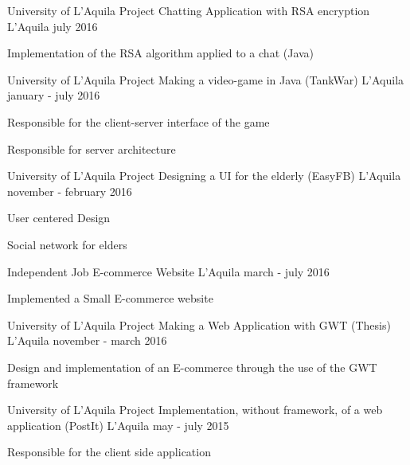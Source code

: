 \begin{cventries}
\cventry
{University of L'Aquila Project} %
{Chatting Application with RSA encryption} %
{L'Aquila} %
{july 2016} %
{ %
	\begin{cvitems}
		\item {Implementation of the RSA algorithm applied to a chat (Java)}
	\end{cvitems}
}

\cventry
{University of L'Aquila Project} %
{Making a video-game in Java (TankWar)} %
{L'Aquila} %
{january - july 2016} %
{ %
	\begin{cvitems}
		\item {Responsible for the client-server interface of the game}
		\item {Responsible for server architecture}
	\end{cvitems}
}

\cventry
{University of L'Aquila Project} %
{Designing a UI for the elderly (EasyFB)} %
{L'Aquila} %
{november - february 2016} %
{ %
	\begin{cvitems}
		\item {User centered Design}
		\item {Social network for elders}
	\end{cvitems}
}

\cventry
{Independent Job} %
{E-commerce Website} %
{L'Aquila} %
{march - july 2016} %
{ %
\begin{cvitems}
\item {Implemented a Small E-commerce website}
\end{cvitems}
}

\cventry
{University of L'Aquila Project} %
{Making a Web Application with GWT (Thesis)} %
{L'Aquila} %
{november - march 2016} %
{ %
	\begin{cvitems}
		\item {Design and implementation of an E-commerce through the use of the GWT framework}
	\end{cvitems}
}

\cventry
{University of L'Aquila Project} %
{Implementation, without framework, of a web application (PostIt)} %
{L'Aquila} %
{may - july 2015} %
{ %
	\begin{cvitems}
		\item {Responsible for the client side application}
	\end{cvitems}
}

\end{cventries}